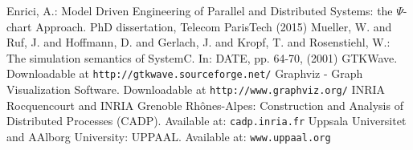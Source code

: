 \documentclass{llncs}
\begin{document}
\begin{flushleft}
\begin{thebibliography}{99}
%
Enrici, A.: Model Driven Engineering of Parallel and Distributed Systems: the $\Psi$-chart Approach. PhD dissertation,
Telecom ParisTech (2015)
%
%
Mueller, W. and Ruf, J. and Hoffmann, D. and Gerlach, J. and Kropf, T. and Rosenstiehl, W.: The simulation semantics of
SystemC. In: DATE, pp. 64-70, (2001)
%
GTKWave. Downloadable at \texttt{http://gtkwave.sourceforge.net/}
%
Graphviz - Graph Visualization Software. Downloadable at \texttt{http://www.graphviz.org/}
%
INRIA Rocquencourt and INRIA Grenoble Rhônes-Alpes: Construction and Analysis of Distributed Processes (CADP). Available
at: \texttt{cadp.inria.fr}
%
Uppsala Universitet and AAlborg University: UPPAAL. Available at: \texttt{www.uppaal.org}

\end{thebibliography}
\end{flushleft}
\end{document}
